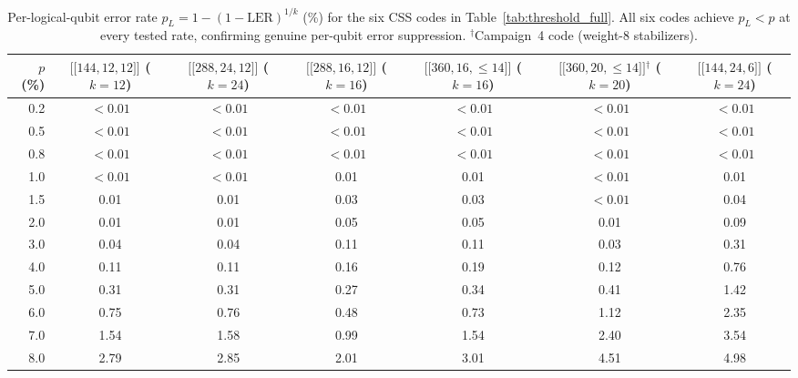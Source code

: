 \documentclass[aps,prxquantum,twocolumn,superscriptaddress,nofootinbib]{revtex4-2}
\newcommand{\dblbrk}[1]{\ensuremath{\lbrack\!\lbrack #1 \rbrack\!\rbrack}}
\newcommand{\code}[1]{\dblbrk{#1}}
\begin{document}
\begin{table}[t]
\centering
\caption{Per-logical-qubit error rate $p_L = 1{-}(1{-}\text{LER})^{1/k}$ (\%) for the six CSS codes in Table~\ref{tab:threshold_full}.
All six codes achieve $p_L < p$ at every tested rate, confirming genuine per-qubit error suppression.
$^\dagger$Campaign~4 code (weight-8 stabilizers).}
\label{tab:per_qubit_full}
\footnotesize
\begin{tabular}{r|c|c|c|c|c|c}
\toprule
$p$ (\%) & $\code{144,12,12}$ ($k{=}12$) & $\code{288,24,12}$ ($k{=}24$) & $\code{288,16,12}$ ($k{=}16$) & $\code{360,16,{\leq}14}$ ($k{=}16$) & $\code{360,20,{\leq}14}$$^\dagger$ ($k{=}20$) & $\code{144,24,6}$ ($k{=}24$) \\
\midrule
0.2 & ${<}0.01$ & ${<}0.01$ & ${<}0.01$ & ${<}0.01$ & ${<}0.01$ & ${<}0.01$ \\
0.5 & ${<}0.01$ & ${<}0.01$ & ${<}0.01$ & ${<}0.01$ & ${<}0.01$ & ${<}0.01$ \\
0.8 & ${<}0.01$ & ${<}0.01$ & ${<}0.01$ & ${<}0.01$ & ${<}0.01$ & ${<}0.01$ \\
1.0 & ${<}0.01$ & ${<}0.01$ & 0.01 & 0.01 & ${<}0.01$ & 0.01 \\
1.5 & 0.01 & 0.01 & 0.03 & 0.03 & ${<}0.01$ & 0.04 \\
2.0 & 0.01 & 0.01 & 0.05 & 0.05 & 0.01 & 0.09 \\
3.0 & 0.04 & 0.04 & 0.11 & 0.11 & 0.03 & 0.31 \\
4.0 & 0.11 & 0.11 & 0.16 & 0.19 & 0.12 & 0.76 \\
5.0 & 0.31 & 0.31 & 0.27 & 0.34 & 0.41 & 1.42 \\
6.0 & 0.75 & 0.76 & 0.48 & 0.73 & 1.12 & 2.35 \\
7.0 & 1.54 & 1.58 & 0.99 & 1.54 & 2.40 & 3.54 \\
8.0 & 2.79 & 2.85 & 2.01 & 3.01 & 4.51 & 4.98 \\
\bottomrule
\end{tabular}
\end{table}
\end{document}

